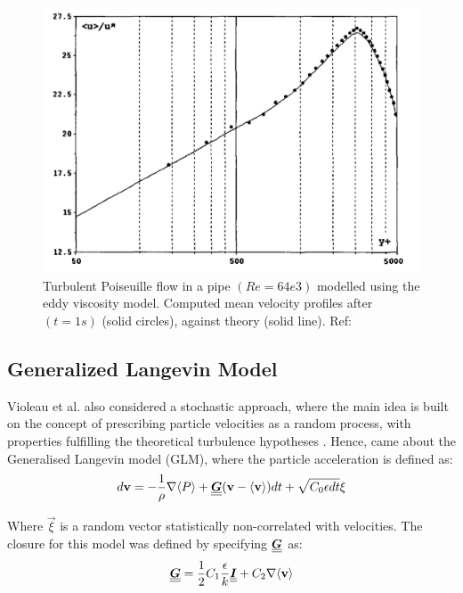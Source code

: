 \begin{figure}[h]
    \centering
    \includegraphics{Figures/research_papers/violeau2002-eddy-viscosity-result.png}
    \caption{Turbulent Poiseuille flow in a pipe $(Re = 64e3)$ modelled using the eddy viscosity model. Computed mean velocity profiles after $(t=1s)$ (solid circles), against theory (solid line). Ref: \parencite{VIOLEAU2002}}
    \label{fig:violeau2002-eddy-viscosity-result}
\end{figure}

\subsection{Generalized Langevin Model}
Violeau et al. also considered a stochastic approach, where the main idea is built on the concept of prescribing particle velocities as a random process, with properties fulfilling the theoretical turbulence hypotheses \parencite{pope1994lagrangi}. Hence, came about the Generalised Langevin model (GLM), where the particle acceleration is defined as:
\begin{equation}
    d\mathbf{v} = -\frac{1}{\rho} \nabla \langle P \rangle + \underline{\underline{\bm{G}}}(\mathbf{v} - \langle \mathbf{v} \rangle)dt + \sqrt{C_0 \epsilon dt}\mathbf{\xi}
    \label{eq:violeau-glm-particle-accel}
\end{equation}

Where $\Vec{\xi}$ is a random vector statistically non-correlated with velocities. The closure for this model was defined by specifying $\underline{\underline{\bm{G}}}$ as:
\begin{equation}
    \underline{\underline{\bm{G}}} = \frac{1}{2} C_1 \frac{\epsilon}{k}\underline{\underline{\bm{I}}} + C_2 \nabla \langle \mathbf{v} \rangle
\end{equation}

